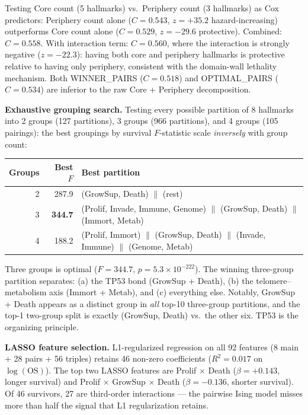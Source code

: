 \documentclass[
  11pt,
]{article}
\begin{document}
Testing Core count (5 hallmarks) vs.~Periphery count (3 hallmarks) as
Cox predictors: Periphery count alone (\(C = 0.543\), \(z = +35.2\)
hazard-increasing) outperforms Core count alone (\(C = 0.529\),
\(z = -29.6\) protective). Combined: \(C = 0.558\). With interaction
term: \(C = 0.560\), where the interaction is strongly negative
(\(z = -22.3\)): having both core and periphery hallmarks is protective
relative to having only periphery, consistent with the domain-wall
lethality mechanism. Both WINNER\_PAIRS (\(C = 0.518\)) and
OPTIMAL\_PAIRS (\(C = 0.534\)) are inferior to the raw Core + Periphery
decomposition.

\textbf{Exhaustive grouping search.} Testing every possible partition of
8 hallmarks into 2 groups (127 partitions), 3 groups (966 partitions),
and 4 groups (105 pairings): the best groupings by survival
\(F\)-statistic scale \emph{inversely} with group count:

\begin{center}
\begin{tabular}{r r l}
\hline
\textbf{Groups} & \textbf{Best $F$} & \textbf{Best partition} \\
\hline
2 & 287.9 & (GrowSup, Death) $\|$ (rest) \\
3 & \textbf{344.7} & (Prolif, Invade, Immune, Genome) $\|$ (GrowSup, Death) $\|$ (Immort, Metab) \\
4 & 188.2 & (Prolif, Immort) $\|$ (GrowSup, Death) $\|$ (Invade, Immune) $\|$ (Genome, Metab) \\
\hline
\end{tabular}
\end{center}

Three groups is optimal (\(F = 344.7\), \(p = 5.3 \times 10^{-222}\)).
The winning three-group partition separates: (a) the TP53 bond (GrowSup
+ Death), (b) the telomere--metabolism axis (Immort + Metab), and (c)
everything else. Notably, GrowSup + Death appears as a distinct group in
\emph{all} top-10 three-group partitions, and the top-1 two-group split
is exactly (GrowSup, Death) vs.~the other six. TP53 is the organizing
principle.

\textbf{LASSO feature selection.} L1-regularized regression on all 92
features (8 main + 28 pairs + 56 triples) retains 46 non-zero
coefficients (\(R^2 = 0.017\) on \(\log(\mathrm{OS})\)). The top two
LASSO features are Prolif \(\times\) Death (\(\beta = +0.143\), longer
survival) and Prolif \(\times\) GrowSup \(\times\) Death
(\(\beta = -0.136\), shorter survival). Of 46 survivors, 27 are
third-order interactions --- the pairwise Ising model misses more than
half the signal that L1 regularization retains.
\end{document}
